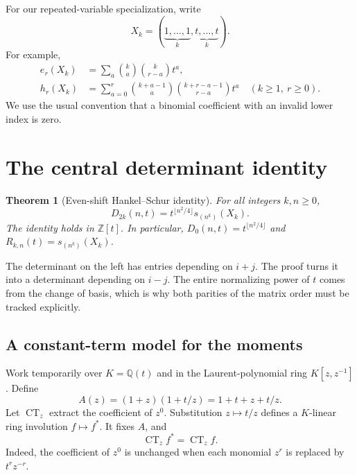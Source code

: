 \documentclass[11pt,a4paper]{article}
\newtheorem{theorem}{Theorem}[section]
\theoremstyle{definition}
\theoremstyle{remark}
\newcommand{\CT}{\operatorname{CT}_z}
\newcommand{\Q}{\mathbb Q}
\newcommand{\Z}{\mathbb Z}
\numberwithin{equation}{section}
\begin{document}
For our repeated-variable specialization, write
\begin{equation}
 X_k=(\underbrace{1,\ldots,1}_{k},
        \underbrace{t,\ldots,t}_{k}).
 \label{eq:alphabet}
\end{equation}
For example,
\begin{align}
 e_r(X_k)&=\sum_a\binom{k}{a}\binom{k}{r-a}t^a,\label{eq:e-explicit}\\
 h_r(X_k)&=\sum_{a=0}^{r}\binom{k+a-1}{a}
                   \binom{k+r-a-1}{r-a}t^a \quad(k\ge1,\ r\ge0).
 \label{eq:h-explicit}
\end{align}
We use the usual convention that a binomial coefficient with an invalid
lower index is zero.

\section{The central determinant identity}
\label{sec:main}
\begin{theorem}[Even-shift Hankel--Schur identity]
\label{thm:main}
For all integers \(k,n\ge0\),
\begin{equation}
 \boxed{\displaystyle
 D_{2k}(n,t)=t^{\lfloor n^2/4\rfloor}s_{(n^k)}(X_k).}
 \label{eq:main}
\end{equation}
The identity holds in \(\Z[t]\). In particular,
\(D_0(n,t)=t^{\lfloor n^2/4\rfloor}\) and
\(R_{k,n}(t)=s_{(n^k)}(X_k)\).
\end{theorem}

The determinant on the left has entries depending on \(i+j\). The proof
turns it into a determinant depending on \(i-j\). The entire normalizing
power of \(t\) comes from the change of basis, which is why both parities
of the matrix order must be tracked explicitly.

\subsection{A constant-term model for the moments}
Work temporarily over \(K=\Q(t)\) and in the Laurent-polynomial ring
\(K[z,z^{-1}]\). Define
\begin{equation}
 A(z)=(1+z)(1+t/z)=1+t+z+t/z.
 \label{eq:A}
\end{equation}
Let \(\CT\) extract the coefficient of \(z^0\). Substitution
\(z\mapsto t/z\) defines a \(K\)-linear ring involution \(f\mapsto f^*\).
It fixes \(A\), and
\begin{equation}
 \CT f^*=\CT f.
 \label{eq:ct-star}
\end{equation}
Indeed, the coefficient of \(z^0\) is unchanged when each monomial
\(z^r\) is replaced by \(t^rz^{-r}\).
\end{document}

